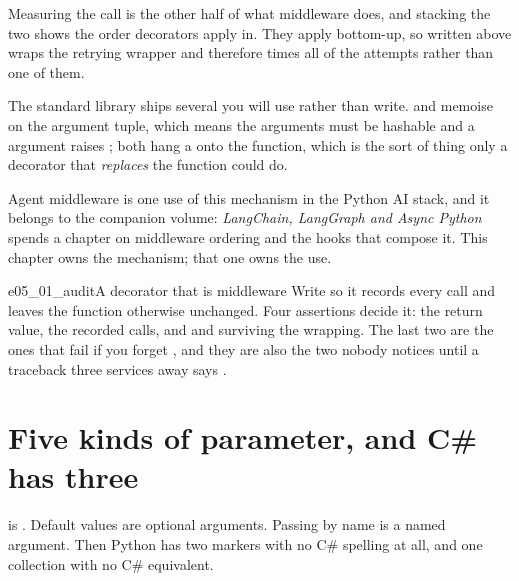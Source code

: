 \noindent
Measuring the call is the other half of what middleware does, and stacking
the two shows the order decorators apply in. They apply bottom-up, so
 written above  wraps the retrying wrapper and
therefore times all of the attempts rather than one of them.



The standard library ships several you will use rather than write.
 and  memoise on the
argument tuple, which means the arguments must be hashable and a
 argument raises ; both hang a
 onto the function, which is the sort of thing only a
decorator that \emph{replaces} the function could do.

\begin{note}
Agent middleware is one use of this mechanism in the Python AI
stack, and it belongs to the companion volume: \emph{LangChain, LangGraph
and Async Python} spends a chapter on middleware ordering and the hooks
that compose it. This chapter owns the mechanism; that one owns the use.
\end{note}

\begin{exercise}{e05_01_audit}{A decorator that is middleware}
Write  so it records every call and leaves the function
otherwise unchanged. Four assertions decide it: the return value, the
recorded calls, and  and  surviving the
wrapping. The last two are the ones that fail if you forget
, and they are also the two nobody notices until a
traceback three services away says .
\end{exercise}

\section{Five kinds of parameter, and C\# has three}
\label{sec:ch05-parameters}

 is . Default values are optional arguments.
Passing by name is a named argument. Then Python has two markers with no
C\# spelling at all, and one collection with no C\# equivalent.


